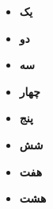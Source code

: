\renewcommand{\thepage}{\texorpdfstring{\lr{\arabic{page}}}{\arabic{page}}}

\setcounter{MyC}{1}
\setcounter{MyC}{1}
\setcounter{MyC}{1}

\begin{abstract}
\ptext[1-2]
\end{abstract}

\begin{multicols}{4}
\begin{itemize}
	\item \textbf{یک}
	\item \textbf{دو}
	\item \textbf{سه}
	\item \textbf{چهار}
	\item \textbf{پنج}
	\item \textbf{شش}
	\item \textbf{هفت}
	\item \textbf{هشت}
\end{itemize}
\end{multicols}

\vfill\newpage

\tableofcontents
\vfill\newpage

\listoffigures
\vfill\newpage

\listoftables
\vfill\newpage

\lstlistoflistings
\vfill\newpage

\vfill\newpage
{}
